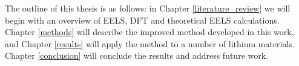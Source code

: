 The outline of this thesis is as follows: in Chapter \ref{literature_review} we will begin with an overview of EELS, DFT and theoretical EELS calculations.  Chapter \ref{methods} will describe the improved method developed in this work, and Chapter \ref{results} will apply the method to a number of lithium materials.  Chapter \ref{conclusion} will conclude the results and address future work.


